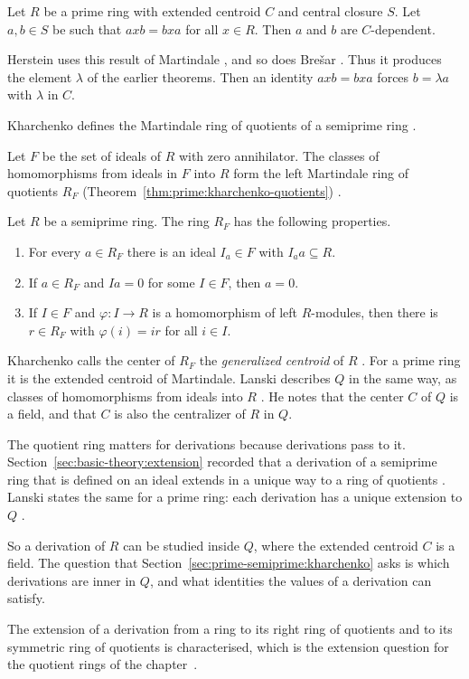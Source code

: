\begin{theorem}\label{thm:prime:martindale-dependent}
Let $R$ be a prime ring with extended centroid $C$ and central closure $S$.
Let $a,b\in S$ be such that $axb=bxa$ for all $x\in R$. Then $a$ and $b$ are
$C$-dependent.
\end{theorem}

Herstein uses this result of Martindale \cite[p.~510]{Herstein1979}, and so
does Bre\v{s}ar \cite[p.~387]{Bresar1993}. Thus it produces the element $\lambda$ of
the earlier theorems. Then an identity $axb=bxa$ forces $b=\lambda a$ with
$\lambda$ in $C$.

Kharchenko defines the Martindale ring of quotients of a semiprime ring
\cite[Section~1.4, p.~19]{Kharchenko1991}.

Let $F$ be the set of ideals of $R$ with zero annihilator. The classes of
homomorphisms from ideals in $F$ into $R$ form the left Martindale ring of
quotients $R_F$ (Theorem~\ref{thm:prime:kharchenko-quotients}) \cite[1.4.8, p.~21]{Kharchenko1991}.

\begin{theorem}\label{thm:prime:kharchenko-quotients}
Let $R$ be a semiprime ring. The ring $R_F$ has the following properties.
\begin{enumerate}
\item For every $a\in R_F$ there is an ideal $I_a\in F$ with $I_aa\subseteq R$.
\item If $a\in R_F$ and $Ia=0$ for some $I\in F$, then $a=0$.
\item If $I\in F$ and $\varphi\colon I\to R$ is a homomorphism of left
$R$-modules, then there is $r\in R_F$ with $\varphi(i)=ir$ for all $i\in I$.
\end{enumerate}
\end{theorem}

Kharchenko calls the center of $R_F$ the \emph{generalized centroid} of $R$
\cite[1.5.1, p.~24]{Kharchenko1991}. For a prime ring it is the extended
centroid of Martindale. Lanski describes $Q$ in the same way, as classes of
homomorphisms from ideals into $R$ \cite[p.~277]{Lanski1988}. He notes that the
center $C$ of $Q$ is a field, and that $C$ is also the centralizer of $R$ in $Q$.

The quotient ring matters for derivations because derivations pass to it.
Section~\ref{sec:basic-theory:extension} recorded that a derivation of a
semiprime ring that is defined on an ideal extends in a unique way to a ring of
quotients \cite[Proposition~1.8.1, p.~50]{Kharchenko1991}. Lanski states the
same for a prime ring: each derivation has a unique extension to $Q$
\cite[p.~277]{Lanski1988}.

So a derivation of $R$ can be studied inside $Q$, where the extended centroid
$C$ is a field. The question that Section~\ref{sec:prime-semiprime:kharchenko}
asks is which derivations are inner in $Q$, and what identities the values of
a derivation can satisfy.

The extension of a derivation from a ring to its right ring of quotients and to its symmetric ring of quotients is characterised, which is the extension question for the quotient rings of the chapter~\cite{WlExtendingRingDerivationsToRigh2020}.
